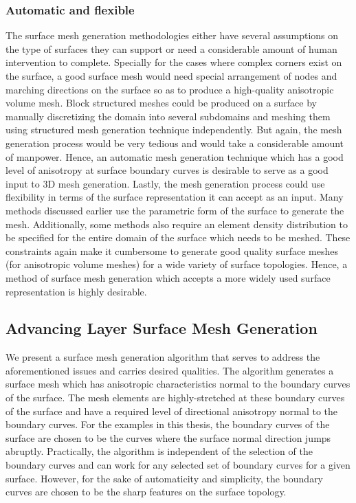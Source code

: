 \subsubsection{Automatic and flexible}

The surface mesh generation methodologies either have several assumptions on the type of surfaces they can support or need a considerable amount of human intervention to complete. Specially for the cases where complex corners exist on the surface, a good surface mesh would need special arrangement of nodes and marching directions on the surface so as to produce a high-quality anisotropic volume mesh. Block structured meshes could be produced on a surface by manually discretizing the domain into several subdomains and meshing them using structured mesh generation technique independently. But again, the mesh generation process would be very tedious and would take a considerable amount of manpower. Hence, an automatic mesh generation technique which has a good level of anisotropy at surface boundary curves is desirable to serve as a good input to 3D mesh generation. Lastly, the mesh generation process could use flexibility in terms of the surface representation it can accept as an input. Many methods discussed earlier use the parametric form of the surface to generate the mesh. Additionally, some methods also require an element density distribution to be specified for the entire domain of the surface which needs to be meshed. These constraints again make it cumbersome to generate good quality surface meshes (for anisotropic volume meshes) for a wide variety of surface topologies. Hence, a method of surface mesh generation which accepts a more widely used surface representation is highly desirable.

\subsection{Advancing Layer Surface Mesh Generation}

We present a surface mesh generation algorithm that serves to address the aforementioned issues and carries desired qualities. The algorithm generates a surface mesh which has anisotropic characteristics normal to the boundary curves of the surface. The mesh elements are highly-stretched at these boundary curves of the surface and have a required level of directional anisotropy normal to the boundary curves. For the examples in this thesis, the boundary curves of the surface are chosen to be the curves where the surface normal direction jumps abruptly. Practically, the algorithm is independent of the selection of the boundary curves and can work for any selected set of boundary curves for a given surface. However, for the sake of automaticity and simplicity, the boundary curves are chosen to be the sharp features on the surface topology.

